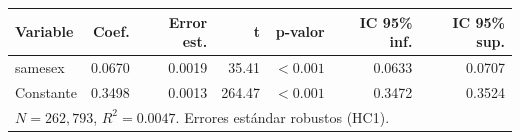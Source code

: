 
\begin{tabular}{lrrrrrr}
\toprule
Variable & Coef. & Error est. & t & p-valor & IC 95\% inf. & IC 95\% sup.\\
\midrule
samesex & 0.0670 & 0.0019 & 35.41 & $<0.001$ & 0.0633 & 0.0707\\
Constante & 0.3498 & 0.0013 & 264.47 & $<0.001$ & 0.3472 & 0.3524\\
\midrule
\multicolumn{7}{l}{$N=262{,}793$, $R^2=0.0047$. Errores estándar robustos (HC1).}\\
\bottomrule
\end{tabular}
